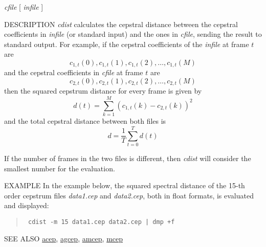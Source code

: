 \begin{synopsis}
\item [cdist] [ --m $M$ ] [ --o $O$ ] [ --f ] {\em cfile}
 	    [ {\em infile} ] 
\end{synopsis}

\begin{qsection}{DESCRIPTION}
{\em cdist} calculates the cepstral distance 
between the cepstral coefficients 
in {\em infile} (or standard input) and the ones in {\em cfile},
sending the result to standard output.
For example, if the cepstral coefficients of the {\em infile} at
frame $t$ are 
\begin{displaymath}
   c_{1,t}(0), c_{1,t}(1), c_{1,t}(2), \dots, c_{1,t}(M)
\end{displaymath}
and the cepstral coefficients in {\em cfile} at frame $t$ are
\begin{displaymath}
   c_{2,t}(0), c_{2,t}(1), c_{2,t}(2), \dots, c_{2,t}(M)
\end{displaymath}
then the squared cepstrum distance for every frame is given by
\begin{displaymath}
   d(t)=\sum_{k=1}^{M} (c_{1,t}(k)-c_{2,t}(k))^2
\end{displaymath}
and the total cepstral distance between both files is
\begin{displaymath}
   d=\frac{1}{T} \sum_{t=0}^{T} d(t)
\end{displaymath}

If the number of frames in the two files is different, then {\em cdist}
will consider the smallest number for the evaluation.
\end{qsection}

\begin{options}
\end{options}

\begin{qsection}{EXAMPLE}
In the example below, the squared spectral distance of the 15-th order
cepstrum files {\em data1.cep} and {\em data2.cep},
both in float formats, is evaluated and displayed:
\begin{quote}
\verb! cdist -m 15 data1.cep data2.cep | dmp +f!
\end{quote}
\end{qsection}

\begin{qsection}{SEE ALSO}
\hyperlink{acep}{acep},
\hyperlink{agcep}{agcep},
\hyperlink{amcep}{amcep},
\hyperlink{mcep}{mcep}
\end{qsection}
